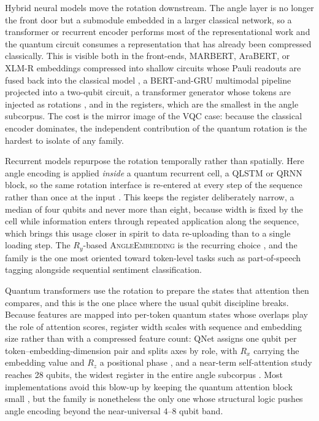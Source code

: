 \documentclass{ieeeaccess}
\begin{document}
Hybrid neural models move the rotation downstream. The angle layer is no longer the front door but a submodule embedded in a larger classical network, so a transformer or recurrent encoder performs most of the representational work and the quantum circuit consumes a representation that has already been compressed classically. This is visible both in the front-ends, MARBERT, AraBERT, or XLM-R embeddings compressed into shallow circuits whose Pauli readouts are fused back into the classical model \cite{suleiman_hdqe_2026}, a BERT-and-GRU multimodal pipeline projected into a two-qubit circuit, a transformer generator whose tokens are injected as rotations \cite{routh_hybrid_2025}, and in the registers, which are the smallest in the angle subcorpus. The cost is the mirror image of the VQC case: because the classical encoder dominates, the independent contribution of the quantum rotation is the hardest to isolate of any family.

Recurrent models repurpose the rotation temporally rather than spatially. Here angle encoding is applied \emph{inside} a quantum recurrent cell, a QLSTM or QRNN block, so the same rotation interface is re-entered at every step of the sequence rather than once at the input \cite{stein_applying_2023,kesiku_quantum_2025,yu_application_2024,diaz-ortiz_strongly_2024}. This keeps the register deliberately narrow, a median of four qubits and never more than eight, because width is fixed by the cell while information enters through repeated application along the sequence, which brings this usage closer in spirit to data re-uploading than to a single loading step. The $R_y$-based \textsc{AngleEmbedding} is the recurring choice \cite{kesiku_quantum_2025}, and the family is the one most oriented toward token-level tasks such as part-of-speech tagging \cite{pandey_quantum_2026} alongside sequential sentiment classification.

Quantum transformers use the rotation to prepare the states that attention then compares, and this is the one place where the usual qubit discipline breaks. Because features are mapped into per-token quantum states whose overlaps play the role of attention scores, register width scales with sequence and embedding size rather than with a compressed feature count: QNet assigns one qubit per token--embedding-dimension pair and splits axes by role, with $R_x$ carrying the embedding value and $R_z$ a positional phase \cite{day_qnet_2023}, and a near-term self-attention study reaches 28 qubits, the widest register in the entire angle subcorpus \cite{he_training_2024}. Most implementations avoid this blow-up by keeping the quantum attention block small \cite{di_sipio_dawn_2022,pham_fitqt_2026}, but the family is nonetheless the only one whose structural logic pushes angle encoding beyond the near-universal $4$--$8$ qubit band.
\end{document}
